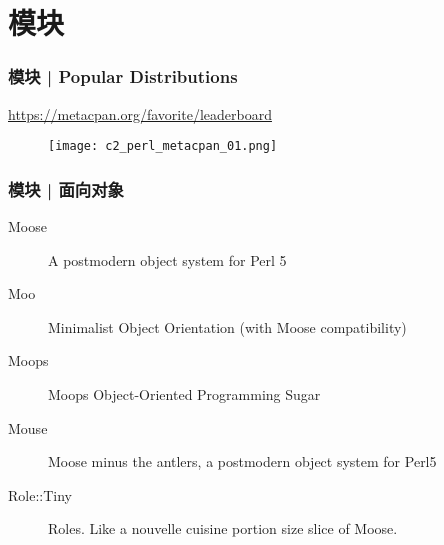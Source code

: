 \section{模块}
\begin{frame}
  \frametitle{模块 | Popular Distributions}
  \begin{center}
    \href{https://metacpan.org/favorite/leaderboard}{https://metacpan.org/favorite/leaderboard}
  \begin{figure}
    \texttt{[image: c2\_perl\_metacpan\_01.png]}
  \end{figure}
\end{center}
\end{frame}

\begin{frame}
  \frametitle{模块 | 面向对象}
    \begin{description}
      \item[Moose] A postmodern object system for Perl 5 
      \item[Moo] Minimalist Object Orientation (with Moose compatibility)
      \item[Moops] Moops Object-Oriented Programming Sugar
      \item[Mouse] Moose minus the antlers, a postmodern object system for Perl5
      \item[Role::Tiny] Roles. Like a nouvelle cuisine portion size slice of Moose.
    \end{description}
\end{frame}

